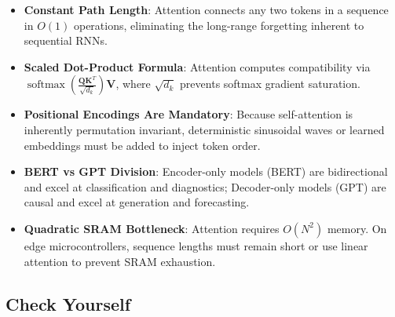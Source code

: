 \begin{takeaways}
\begin{itemize}
    \item \textbf{Constant Path Length}: Attention connects any two tokens in a sequence in $O(1)$ operations, eliminating the long-range forgetting inherent to sequential RNNs.
    \item \textbf{Scaled Dot-Product Formula}: Attention computes compatibility via $\operatorname{softmax}\left(\frac{\mathbf{Q}\mathbf{K}^T}{\sqrt{d_k}}\right)\mathbf{V}$, where $\sqrt{d_k}$ prevents softmax gradient saturation.
    \item \textbf{Positional Encodings Are Mandatory}: Because self-attention is inherently permutation invariant, deterministic sinusoidal waves or learned embeddings must be added to inject token order.
    \item \textbf{BERT vs GPT Division}: Encoder-only models (BERT) are bidirectional and excel at classification and diagnostics; Decoder-only models (GPT) are causal and excel at generation and forecasting.
    \item \textbf{Quadratic SRAM Bottleneck}: Attention requires $O(N^2)$ memory. On edge microcontrollers, sequence lengths must remain short or use linear attention to prevent SRAM exhaustion.
\end{itemize}
\end{takeaways}

\subsection{Check Yourself}\label{subsec:check_yourself}

